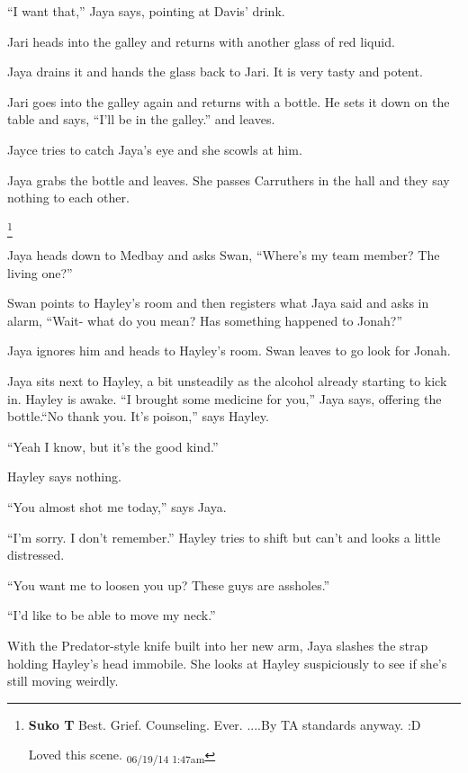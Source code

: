 ``I want that,'' Jaya says, pointing at Davis' drink.

Jari heads into the galley and returns with another glass of red liquid.

Jaya drains it and hands the glass back to Jari.  It is very tasty and potent.

Jari goes into the galley again and returns with a bottle.  He sets it down on the table and says, ``I'll be in the galley.'' and leaves.



Jayce tries to catch Jaya's eye and she scowls at him.



Jaya grabs the bottle and leaves.  She passes Carruthers in the hall and they say nothing to each other.





\footnote{\textbf{Suko T }Best.  Grief.  Counseling.  Ever.  
....By TA standards anyway. :D

Loved this scene. \textsubscript{06/19/14 1:47am}}



Jaya heads down to Medbay and asks Swan, ``Where's my team member?  The living one?''

Swan points to Hayley's room and then registers what Jaya said and asks in alarm, ``Wait- what do you mean?  Has something happened to Jonah?''



Jaya ignores him and heads to Hayley's room.  Swan leaves to go look for Jonah.



Jaya sits next to Hayley, a bit unsteadily as the alcohol already starting to kick in.  Hayley is awake.  ``I brought some medicine for you,'' Jaya says, offering the bottle.``No thank you.  It's poison,'' says Hayley.

``Yeah I know, but it's the good kind.''

Hayley says nothing.

``You almost shot me today,'' says Jaya.

``I'm sorry.  I don't remember.''  Hayley tries to shift but can't and looks a little distressed.

``You want me to loosen you up?  These guys are assholes.''

``I'd like to be able to move my neck.''

With the Predator-style knife built into her new arm, Jaya slashes the strap holding Hayley's head immobile.  She looks at Hayley suspiciously to see if she's still moving weirdly.

